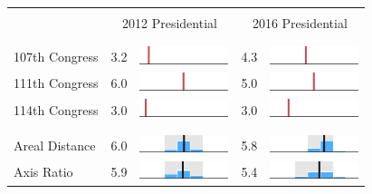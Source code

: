 
\begin{table}
\renewcommand{\arraystretch}{0.7}
 \begin{tabular}{l rm{7em} rm{7em}}
\hline \hline \\

{} & \multicolumn{2}{c}{2012 Presidential} & \multicolumn{2}{c}{2016 Presidential} \\

\\ \hline \\
107th Congress         &   3.2 &          \includegraphics[width=7em]{mini_hist/NC_race_2012_107} &   4.3 &          \includegraphics[width=7em]{mini_hist/NC_race_2016_107} \\
111th Congress         &   6.0 &          \includegraphics[width=7em]{mini_hist/NC_race_2012_111} &   5.0 &          \includegraphics[width=7em]{mini_hist/NC_race_2016_111} \\
114th Congress         &   3.0 &          \includegraphics[width=7em]{mini_hist/NC_race_2012_114} &   3.0 &          \includegraphics[width=7em]{mini_hist/NC_race_2016_114} \\
\\ \hline \\ 
Areal Distance         &   6.0 &       \includegraphics[width=7em]{mini_hist/NC_race_2012_dist_a} &   5.8 &       \includegraphics[width=7em]{mini_hist/NC_race_2016_dist_a} \\
Axis Ratio             &   5.9 &   \includegraphics[width=7em]{mini_hist/NC_race_2012_axis_ratio} &   5.4 &   \includegraphics[width=7em]{mini_hist/NC_race_2016_axis_ratio} \\

\end{tabular}
\end{table}
